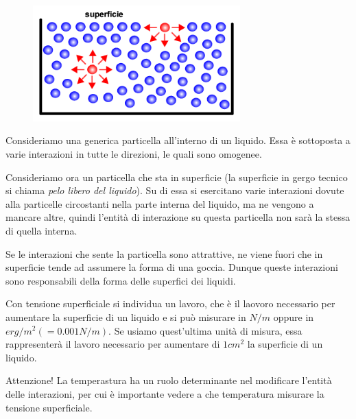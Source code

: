 \begin{figure}[htp]
    \centering
    \includegraphics[width=8cm]{immagini/tensione_superficiale.png}
\end{figure}

Consideriamo una generica particella all'interno di un liquido. Essa è sottoposta a varie interazioni in tutte le direzioni, le quali sono omogenee. 
    
Consideriamo ora un particella che sta in superficie (la superficie in gergo tecnico si chiama \textit{pelo libero del liquido}). Su di essa si esercitano varie interazioni dovute alla particelle circostanti nella parte interna del liquido, ma ne vengono a mancare altre, quindi l'entità di interazione su questa particella non sarà la stessa di quella interna.

Se le interazioni che sente la particella sono attrattive, ne viene fuori che in superficie tende ad assumere la forma di una goccia. Dunque queste interazioni sono responsabili della forma delle superfici dei liquidi.

Con tensione superficiale si individua un lavoro, che è il laovoro necessario per aumentare la superficie di un liquido e si può misurare in $N/m$ oppure in $erg/m^2(=0.001N/m)$. Se usiamo quest'ultima unità di misura, essa rappresenterà il lavoro necessario per aumentare di $1cm^2$  la superficie di un liquido.

Attenzione! La temperastura ha un ruolo determinante nel modificare l'entità delle interazioni, per cui è importante vedere a che temperatura misurare la tensione superficiale.

